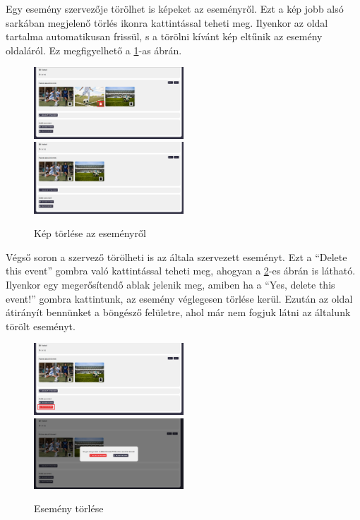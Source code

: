 Egy esemény szervezője törölhet is képeket az eseményről. Ezt a kép jobb alsó sarkában megjelenő törlés ikonra kattintással teheti meg. Ilyenkor az oldal 
tartalma automatikusan frissül, s a törölni kívánt kép eltűnik az esemény oldaláról. Ez megfigyelhető a \ref{fig:delete_image_event}-as ábrán.

\begin{figure}[h]
	\includegraphics[width=0.5\textwidth]{images/delete_image_event_1.png}
	\includegraphics[width=0.5\textwidth]{images/delete_image_event_2.png}
	\caption{Kép törlése az eseményről}
	\label{fig:delete_image_event}
\end{figure}

Végső soron a szervező törölheti is az általa szervezett eseményt. Ezt a ``Delete this event'' gombra való kattintással teheti meg, ahogyan a \ref{fig:delete_event_details}-es ábrán is látható.
Ilyenkor egy megerősítendő ablak jelenik meg, amiben ha a ``Yes, delete this event!'' gombra kattintunk, az esemény véglegesen törlése kerül.
Ezután az oldal átirányít bennünket a böngésző felületre, ahol már nem fogjuk látni az általunk törölt eseményt.

\begin{figure}[ht]
	\includegraphics[width=0.5\textwidth]{images/delete_this_event_1.png}
	\includegraphics[width=0.5\textwidth]{images/delete_this_event_2.png}
	\caption{Esemény törlése}
	\label{fig:delete_event_details}
\end{figure}

